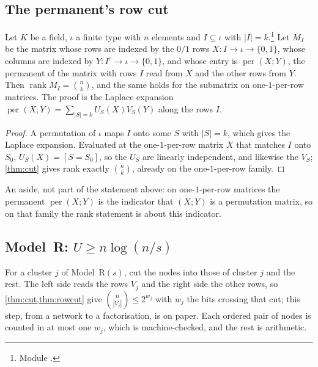 \documentclass[10pt]{amsart}
\theoremstyle{plain}
\theoremstyle{definition}
\theoremstyle{remark}
\numberwithin{equation}{section}
\newcommand{\per}{\operatorname{per}}
\newcommand{\rk}{\operatorname{rank}}
\begin{document}
\subsection{The permanent's row cut}\label{sec:rowcut}
\begin{theorem}\label{thm:rowcut}
Let $K$ be a field, $\iota$ a finite type with $n$ elements and $I\subseteq\iota$ with
$|I|=k$.\footnote{Module .} Let $M_I$ be the matrix whose rows are
indexed by the $0/1$ rows $X:I\to\iota\to\{0,1\}$, whose columns are indexed by
$Y:I^c\to\iota\to\{0,1\}$, and whose entry is $\per(X;Y)$, the permanent of the matrix with rows $I$
read from $X$ and the other rows from $Y$. Then $\rk M_I=\binom nk$, and the same holds for the
submatrix on one-$1$-per-row matrices. The proof is the Laplace expansion
$\per(X;Y)=\sum_{|S|=k}U_S(X)V_S(Y)$ along the rows $I$.
\end{theorem}
\begin{proof}
A permutation of $\iota$ maps $I$ onto some $S$ with $|S|=k$, which gives the Laplace expansion. Evaluated
at the one-$1$-per-row matrix $X$ that matches $I$ onto $S_0$, $U_S(X)=[S=S_0]$, so the $U_S$ are
linearly independent, and likewise the $V_S$; \cref{thm:cut} gives rank exactly $\binom nk$, already on
the one-$1$-per-row family.
\end{proof}

\noindent An aside, not part of the statement above: on one-$1$-per-row matrices the permanent
$\per(X;Y)$ is the indicator that $(X;Y)$ is a permutation matrix, so on that family the rank statement
is about this indicator.

\subsection{Model~R: \texorpdfstring{$U\ge n\log(n/s)$}{U >= n log(n/s)}}\label{sec:modelR}
For a cluster $j$ of Model~R$(s)$, cut the nodes into those of cluster $j$ and the rest. The left side
reads the rows $V_j$ and the right side the other rows, so \cref{thm:cut,thm:rowcut} give
$\binom n{|V_j|}\le2^{w_j}$ with $w_j$ the bits crossing that cut; this step, from a network to a
factorisation, is on paper. Each ordered pair of nodes is counted in at most one $w_j$, which is
machine-checked, and the rest is arithmetic.
\end{document}
